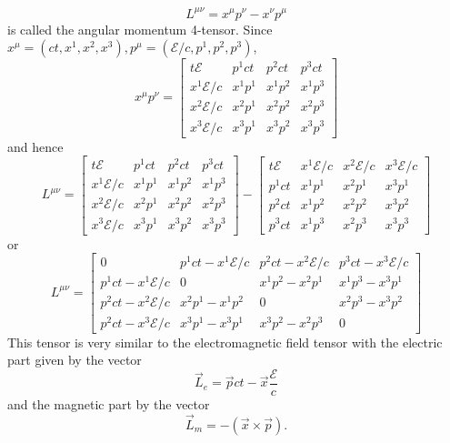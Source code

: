 \begin{enumerate}
\begin{equation}
L^{\mu\nu} = x^{\mu}p^{\nu} - x^{\nu}p^{\mu}
\end{equation}
is called the angular momentum 4-tensor. Since $x^\mu = (ct, x^1, x^2, x^3), 
p^\mu = (\mathcal{E}/c, p^1, p^2, p^3)$,
\[
x^\mu p^\nu = \begin{bmatrix}t\mathcal{E} & p^1ct & p^2ct & p^3ct \\
x^1\mathcal{E}/c & x^1p^1 & x^1p^2 & x^1p^3 \\
x^2\mathcal{E}/c & x^2p^1 & x^2p^2 & x^2p^3 \\
x^3\mathcal{E}/c & x^3p^1 & x^3p^2 & x^3p^3
\end{bmatrix}
\]
and hence
\[
L^{\mu\nu} = \begin{bmatrix}t\mathcal{E} & p^1ct & p^2ct & p^3ct \\
x^1\mathcal{E}/c & x^1p^1 & x^1p^2 & x^1p^3 \\
x^2\mathcal{E}/c & x^2p^1 & x^2p^2 & x^2p^3 \\
x^3\mathcal{E}/c & x^3p^1 & x^3p^2 & x^3p^3
\end{bmatrix} - 
\begin{bmatrix}t\mathcal{E} & x^1\mathcal{E}/c & x^2\mathcal{E}/c & 
x^3\mathcal{E}/c \\
p^1ct & x^1p^1 & x^2p^1 & x^3p^1 \\
p^2ct & x^1p^2 & x^2p^2 & x^3p^2 \\
p^3ct & x^1p^3 & x^2p^3 & x^3p^3
\end{bmatrix}
\]
or
\begin{equation}\label{c2e87}
L^{\mu\nu} = \begin{bmatrix}
0 & p^1ct - x^1\mathcal{E}/c & p^2ct - x^2\mathcal{E}/c & p^3ct - 
x^3\mathcal{E}/c\\
p^1ct - x^1\mathcal{E}/c & 0 & x^1p^2 - x^2p^1 & x^1p^3 - x^3p^1 \\
p^2ct - x^2\mathcal{E}/c & x^2p^1 - x^1p^2 & 0 & x^2p^3 - x^3p^2 \\
p^2ct - x^3\mathcal{E}/c & x^3p^1 - x^3p^1 & x^3p^2 - x^2p^3 & 0
\end{bmatrix}
\end{equation}
This tensor is very similar to the electromagnetic field tensor with the 
electric part given by the vector
\begin{equation}\label{c2e88}
\vec{L}_e = \vec{p}ct - \vec{x}\frac{\mathcal{E}}{c}
\end{equation}
and the magnetic part by the vector
\begin{equation}\label{c2e89}
\vec{L}_m = -(\vec{x} \times \vec{p}).
\end{equation}

\end{enumerate}
